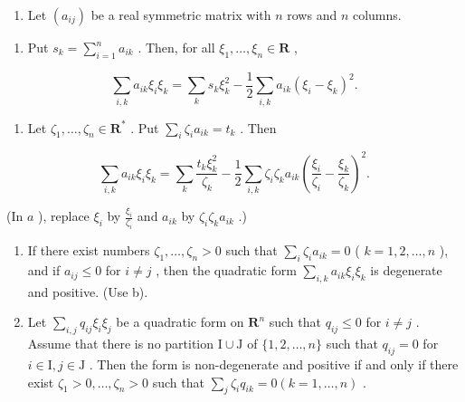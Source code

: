 \begin{enumerate}
\def\labelenumi{\arabic{enumi})}
\setcounter{enumi}{7}
\tightlist
\item
  Let \((a_{ij})\) be a real symmetric matrix with \(n\) rows and \(n\) columns.
\end{enumerate}

\begin{enumerate}
\def\labelenumi{\alph{enumi})}
\tightlist
\item
  Put \(s_k = \sum_{i=1}^{n} a_{ik}\) . Then, for all \(\xi_1, \ldots, \xi_n \in \mathbf{R}\) ,
\end{enumerate}

\[
\sum_ {i, k} a _ {i k} \xi_ {i} \xi_ {k} = \sum_ {k} s _ {k} \xi_ {k} ^ {2} - \frac {1}{2} \sum_ {i, k} a _ {i k} (\xi_ {i} - \xi_ {k}) ^ {2}.
\]

\begin{enumerate}
\def\labelenumi{\alph{enumi})}
\setcounter{enumi}{1}
\tightlist
\item
  Let \(\zeta_1, \ldots, \zeta_n \in \mathbf{R}^*\) . Put \(\sum_{i} \zeta_i a_{ik} = t_k\) . Then
\end{enumerate}

\[
\sum_ {i, k} a _ {i k} \xi_ {i} \xi_ {k} = \sum_ {k} \frac {t _ {k} \xi_ {k} ^ {2}}{\zeta_ {k}} - \frac {1}{2} \sum_ {i, k} \zeta_ {i} \zeta_ {k} a _ {i k} \left(\frac {\xi_ {i}}{\zeta_ {i}} - \frac {\xi_ {k}}{\zeta_ {k}}\right) ^ {2}.
\]

(In \(a\) ), replace \(\xi_{i}\) by \(\frac{\xi_i}{\zeta_i}\) and \(a_{ik}\) by \(\zeta_i\zeta_k a_{ik}\) .)

\begin{enumerate}
\def\labelenumi{\alph{enumi})}
\setcounter{enumi}{2}
\item
  If there exist numbers \(\zeta_1, \ldots, \zeta_n > 0\) such that \(\sum_{i} \zeta_i a_{ik} = 0\) ( \(k = 1, 2, \ldots, n\) ), and if \(a_{ij} \leqslant 0\) for \(i \neq j\) , then the quadratic form \(\sum_{i,k} a_{ik} \xi_i \xi_k\) is degenerate and positive. (Use b).
\item
  Let \(\sum_{i,j} q_{ij} \xi_i \xi_j\) be a quadratic form on \(\mathbf{R}^n\) such that \(q_{ij} \leqslant 0\) for \(i \neq j\) . Assume that there is no partition \(\mathrm{I} \cup \mathrm{J}\) of \(\{1,2,\ldots,n\}\) such that \(q_{ij} = 0\) for \(i \in \mathrm{I}, j \in \mathrm{J}\) . Then the form is non-degenerate and positive if and only if there exist \(\zeta_1 > 0, \ldots, \zeta_n > 0\) such that \(\sum_{j} \zeta_i q_{ik} = 0 (k = 1, \ldots, n)\) .
\end{enumerate}

